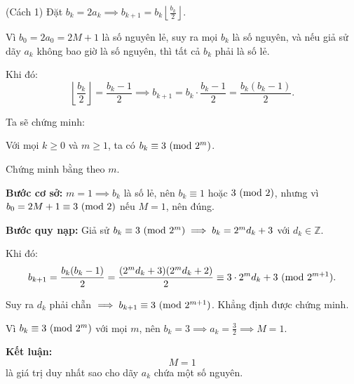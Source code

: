 \documentclass[../05-modular-arithmetic-a.tex]{subfiles}
\begin{document}
\begin{soln}(Cách 1)\footnotemark
	Đặt \( b_k = 2a_k \implies b_{k+1} = b_k \left\lfloor \frac{b_k}{2} \right\rfloor \).

	Vì \( b_0 = 2a_0 = 2M + 1 \) là số nguyên lẻ, suy ra mọi \( b_k \) là số nguyên, và nếu giả sử dãy \( a_k \) không bao giờ là số nguyên, thì tất cả \( b_k \) phải là số lẻ.

	Khi đó:
	\[
		\left\lfloor \frac{b_k}{2} \right\rfloor = \frac{b_k - 1}{2}
	\implies b_{k+1} = b_k \cdot \frac{b_k - 1}{2} = \frac{b_k(b_k - 1)}{2}. \tag{1}
	\]

	Ta sẽ chứng minh:
	\begin{claim*}
		Với mọi \( k \ge 0 \) và \( m \ge 1 \), ta có \( b_k \equiv 3 \ (\mathrm{mod}\ 2^m) \).
	\end{claim*}
	\begin{subproof}
		Chứng minh bằng  theo \( m \).

		\textbf{Bước cơ sở:} \( m = 1 \implies b_k \) là số lẻ, nên \( b_k \equiv 1 \) hoặc \( 3 \ (\mathrm{mod}\ 2) \), nhưng vì \( b_0 = 2M + 1 \equiv 3 \ (\mathrm{mod}\ 2) \) nếu \( M = 1 \), nên đúng.

		\textbf{Bước quy nạp:} Giả sử \( b_k \equiv 3 \ (\mathrm{mod}\ 2^m) \implies b_k = 2^m d_k + 3 \) với \( d_k \in \mathbb{Z} \).

		Khi đó:
		\[
		b_{k+1} = \frac{b_k(b_k - 1)}{2} = \frac{(2^m d_k + 3)(2^m d_k + 2)}{2}
		\equiv 3 \cdot 2^m d_k + 3 \ (\mathrm{mod}\ 2^{m+1}).
		\]

		Suy ra \( d_k \) phải chẵn \( \implies b_{k+1} \equiv 3 \ (\mathrm{mod}\ 2^{m+1}) \). Khẳng định được chứng minh.
	\end{subproof}

	Vì \( b_k \equiv 3 \ (\mathrm{mod}\ 2^m) \) với mọi \( m \), nên \( b_k = 3 \implies a_k = \frac{3}{2} \implies M = 1 \).

	\textbf{Kết luận:}
	\[
		\boxed{M = 1}
	\]
	là giá trị duy nhất sao cho dãy \( a_k \) chứa một số nguyên.
\end{soln}

\end{document}
